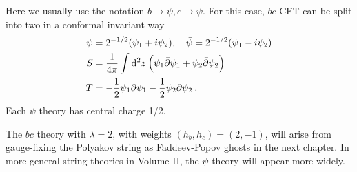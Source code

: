 Here we usually use the notation $b\to \psi,c \to \bar{\psi}$. For this case,    
$bc$ CFT can be split into two in a conformal invariant way    
\begin{subequations} \label{2.5.18}
	\begin{align}
		\psi&=2^{-1 / 2}(\psi_{1}+ i \psi_{2}), \quad \bar{\psi}=2^{-1 / 2}(\psi_{1}- i \psi_{2})  \label{2.5.18a}\\
		S&=\frac{1}{4 \pi} \int \mathrm{d}^{2} z\:\Bigl(\psi_{1} \bar{\partial} \psi_{1}+\psi_{2} \bar{\partial} \psi_{2}\Bigr) \label{2.5.18b}\\
		T&=-\frac{1}{2} \psi_{1} \partial \psi_{1}-\frac{1}{2} \psi_{2} \partial \psi_{2} \:.
		\label{2.5.18c}
	\end{align}
\end{subequations}
Each $\psi$ theory has central charge 1/2.    

The $bc$ theory with $\lambda=2$, with weights $(h_{b}, h_{c})=(2,-1)$, will arise from gauge-fixing the Polyakov string as Faddeev-Popov ghosts in the next chapter. In more general string theories in Volume II, the $\psi$ theory will appear more widely. 


